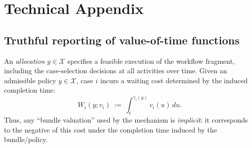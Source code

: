 \documentclass[letterpaper]{article}
\begin{document}



\smallskip
\noindent



\clearpage

\appendix
\newpage
\newpage
\section{Technical Appendix}
\subsection{Truthful reporting of value-of-time functions}
An \emph{allocation} $y\in\mathcal{X}$ specifies a feasible execution of the workflow fragment,
including the case-selection decisions at all activities over time.
Given an admissible policy $y\in\mathcal{X}$, case $i$ incurs
a waiting cost determined by the induced completion time:
\[
W_i(y;v_i)\ :=\ \int_{t}^{\tau_i(y)} v_i(u)\,du .
\]
Thus, any ``bundle valuation'' used by the mechanism is \emph{implicit}:
it corresponds to the negative of this cost under the completion time induced by the
bundle/policy.
\end{document}
